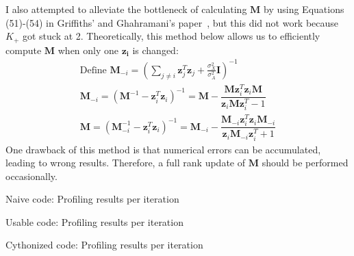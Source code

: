 I also attempted to alleviate the bottleneck of calculating $\mathbf{M}$ by using Equations (51)-(54) in Griffiths' and Ghahramani's paper~\cite{griffiths2005detailed}, but this did not work because $K_+$ got stuck at 2. Theoretically, this method below allows us to efficiently compute $\mathbf{M}$ when only one $\mathbf{z_i}$ is changed:
\begin{gather}
\text{Define } \mathbf{M}_{-i} = (\sum_{j \neq i}\mathbf{z}^T_j \mathbf{z}_j + \frac{\sigma_X^2}{\sigma_A^2}\mathbf{I})^{-1} \\
\mathbf{M}_{-i} = (\mathbf{M}^{-1} - \mathbf{z}^T_i \mathbf{z}_i)^{-1} 
= \mathbf{M} - \dfrac{\mathbf{M}\mathbf{z}^T_i \mathbf{z}_i\mathbf{M}}{\mathbf{z}_i\mathbf{M}\mathbf{z}^T_i - 1} \\
\mathbf{M} = (\mathbf{M}_{-i}^{-1} - \mathbf{z}^T_i \mathbf{z}_i)^{-1} 
= \mathbf{M}_{-i} - \dfrac{\mathbf{M}_{-i}\mathbf{z}^T_i \mathbf{z}_i\mathbf{M}_{-i}}{\mathbf{z}_i\mathbf{M}_{-i}\mathbf{z}^T_i + 1}
\end{gather}
One drawback of this method is that numerical errors can be accumulated, leading to wrong results. Therefore, a full rank update of $\mathbf{M}$ should be performed occasionally.


\begin{table}[!ht]
  \centering
  
  \caption{Naive code: Profiling results per iteration}
  \label{tab:naive}
\end{table}

\begin{table}[!ht]
  \centering
  
  \caption{Usable code: Profiling results per iteration}
  \label{tab:usable}
\end{table}

\begin{table}[!ht]
  \centering
  
  \caption{Cythonized code: Profiling results per iteration}
  \label{tab:cythonized}
\end{table}